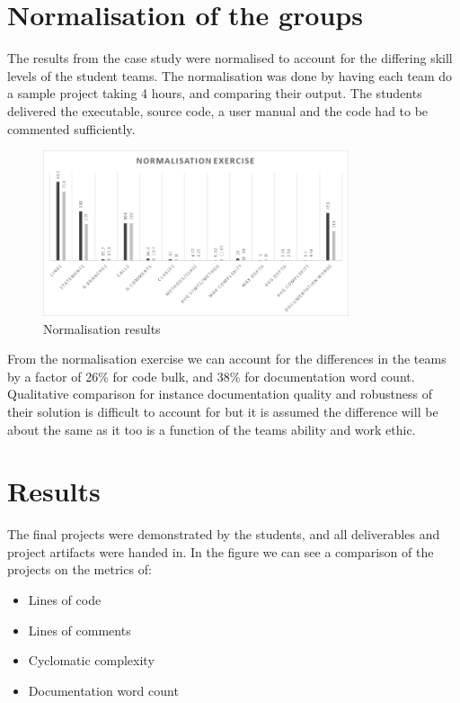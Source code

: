 \documentclass{sig-alternate-05-2015}
\begin{document}

\section{Normalisation of the groups}

The results from the case study were normalised to account for the differing skill levels of the student teams. The normalisation was done by having each team do a sample project taking 4 hours, and comparing their output. The students delivered the executable, source code, a user manual and the code had to be commented sufficiently.

\begin{figure}[t!]
	\centering 
	\includegraphics[width=90mm]{NormalisationExercise.png}
	\caption{Normalisation results}
\end{figure}  

From the normalisation exercise we can account for the differences in the teams by a factor of 26\% for code bulk, and 38\% for documentation word count. Qualitative comparison for instance documentation quality and robustness of their solution is difficult to account for but it is assumed the difference will be about the same as it too is a function of the teams ability and work ethic.

\section{Results}

The final projects were demonstrated by the students, and all deliverables and project artifacts were handed in. In the figure we can see a comparison of the projects on the metrics of:
\begin{itemize}
	\item Lines of code
	\item Lines of comments
	\item Cyclomatic complexity
	\item Documentation word count
\end{itemize}
\end{document}
